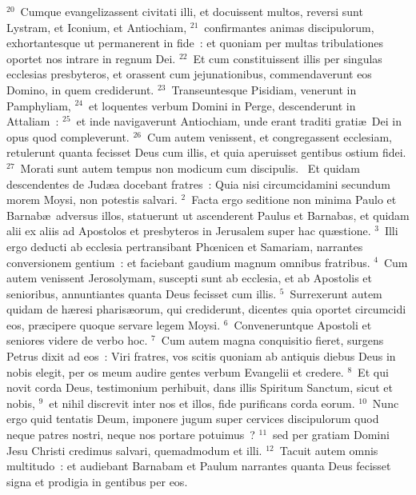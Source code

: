 ${}^{20}$~Cumque evangelizassent civitati illi, et docuissent multos, reversi sunt Lystram, et Iconium, et Antiochiam,
${}^{21}$~confirmantes animas discipulorum, exhortantesque ut permanerent in fide~: et quoniam per multas tribulationes oportet nos intrare in regnum Dei.
${}^{22}$~Et cum constituissent illis per singulas ecclesias presbyteros, et orassent cum jejunationibus, commendaverunt eos Domino, in quem crediderunt.
${}^{23}$~Transeuntesque Pisidiam, venerunt in Pamphyliam,
${}^{24}$~et loquentes verbum Domini in Perge, descenderunt in Attaliam~:
${}^{25}$~et inde navigaverunt Antiochiam, unde erant traditi grati\ae\ Dei in opus quod compleverunt.
${}^{26}$~Cum autem venissent, et congregassent ecclesiam, retulerunt quanta fecisset Deus cum illis, et quia aperuisset gentibus ostium fidei.
${}^{27}$~Morati sunt autem tempus non modicum cum discipulis.
~Et quidam descendentes de Jud\ae a docebant fratres~: Quia nisi circumcidamini secundum morem Moysi, non potestis salvari.
${}^{2}$~Facta ergo seditione non minima Paulo et Barnab\ae\ adversus illos, statuerunt ut ascenderent Paulus et Barnabas, et quidam alii ex aliis ad Apostolos et presbyteros in Jerusalem super hac qu\ae stione.
${}^{3}$~Illi ergo deducti ab ecclesia pertransibant Phœnicen et Samariam, narrantes conversionem gentium~: et faciebant gaudium magnum omnibus fratribus.
${}^{4}$~Cum autem venissent Jerosolymam, suscepti sunt ab ecclesia, et ab Apostolis et senioribus, annuntiantes quanta Deus fecisset cum illis.
${}^{5}$~Surrexerunt autem quidam de h\ae resi pharis\ae orum, qui crediderunt, dicentes quia oportet circumcidi eos, pr\ae cipere quoque servare legem Moysi.
${}^{6}$~Conveneruntque Apostoli et seniores videre de verbo hoc.
${}^{7}$~Cum autem magna conquisitio fieret, surgens Petrus dixit ad eos~: Viri fratres, vos scitis quoniam ab antiquis diebus Deus in nobis elegit, per os meum audire gentes verbum Evangelii et credere.
${}^{8}$~Et qui novit corda Deus, testimonium perhibuit, dans illis Spiritum Sanctum, sicut et nobis,
${}^{9}$~et nihil discrevit inter nos et illos, fide purificans corda eorum.
${}^{10}$~Nunc ergo quid tentatis Deum, imponere jugum super cervices discipulorum quod neque patres nostri, neque nos portare potuimus~?
${}^{11}$~sed per gratiam Domini Jesu Christi credimus salvari, quemadmodum et illi.
${}^{12}$~Tacuit autem omnis multitudo~: et audiebant Barnabam et Paulum narrantes quanta Deus fecisset signa et prodigia in gentibus per eos.


